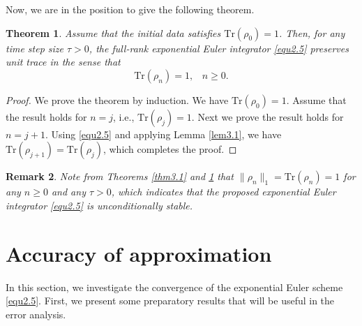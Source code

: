 \documentclass[preprint,3p,compress,12pt]{elsarticle}
\numberwithin{equation}{section}
\newtheorem{theorem}{Theorem}[section]
\newtheorem{rem}[theorem]{Remark}
\numberwithin{figure}{section}
\begin{document}
Now, we are in the position to give the following theorem.

\begin{theorem}\label{thm3.2}
  Assume that the initial data satisfies $\mbox{Tr}(\rho_0)=1$. Then, for any time step size $\tau>0$, the full-rank exponential Euler integrator \eqref{equ2.5} preserves unit trace
  in the sense that
  \[\mbox{Tr}(\rho_n)=1,~~~\, n\geq0.\]
\end{theorem}
\begin{proof}
  We prove the theorem by induction. We have $\mbox{Tr}(\rho_0)=1$. Assume that the result holds for $n=j$, i.e., $\mbox{Tr}(\rho_j)=1$. Next we prove the result holds for $n=j+1$. Using \eqref{equ2.5} and applying Lemma \ref{lem3.1}, we have $\mbox{Tr}(\rho_{j+1})=\mbox{Tr}(\rho_j)$, which completes the proof.
\end{proof}

\begin{rem}
Note from Theorems \ref{thm3.1} and \ref{thm3.2} that $\|\rho_n\|_1=\mbox{Tr}(\rho_n)=1$ for any $n\geq0$ and any $\tau>0$, which indicates that the proposed exponential Euler integrator \eqref{equ2.5} is unconditionally stable.
\end{rem}


\section{Accuracy of approximation}
In this section, we investigate the convergence of the exponential Euler scheme \eqref{equ2.5}. First, we present some preparatory results that will be useful in the error analysis.
\end{document}
